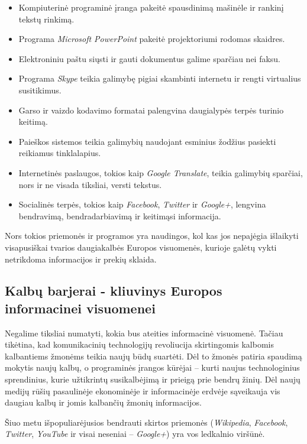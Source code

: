 \begin{multicols}{2}
\begin{itemize}
\item Kompiuterinė programinė įranga pakeitė spausdinimą mašinėle ir rankinį tekstų rinkimą.
\item Programa \textit{ Microsoft PowerPoint} pakeitė projektoriumi rodomas skaidres.
\item Elektroniniu paštu siųsti ir gauti dokumentus galime sparčiau nei faksu.
\item Programa \textit{Skype} teikia galimybę pigiai skambinti internetu ir rengti virtualius susitikimus.
\item Garso ir vaizdo kodavimo formatai palengvina daugialypės terpės turinio keitimą.
\item Paieškos sistemos teikia galimybių naudojant esminius žodžius pasiekti reikiamus tinklalapius.
\item Internetinės paslaugos, tokios kaip \textit{Google Translate}, teikia galimybių sparčiai, nors ir ne visada tiksliai, versti tekstus.
\item Socialinės terpės, tokios kaip \textit{Facebook}, \textit{Twitter} ir \textit{Google+}, lengvina bendravimą, bendradarbiavimą ir keitimąsi informacija.
\end{itemize}

Nors tokios priemonės ir programos yra naudingos, kol kas jos nepajėgia išlaikyti visapusiškai tvarios daugiakalbės Europos visuomenės, kurioje galėtų vykti netrikdoma informacijos ir prekių sklaida.

\subsection{Kalbų barjerai - kliuvinys Europos informacinei visuomenei}
  
 Negalime tiksliai numatyti, kokia bus ateities informacinė visuomenė. Tačiau tikėtina, kad komunikacinių technologijų revoliucija skirtingomis kalbomis kalbantiems žmonėms teikia naujų būdų suartėti. Dėl to žmonės patiria spaudimą mokytis naujų kalbų, o programinės įrangos kūrėjai – kurti naujus technologinius sprendinius, kurie užtikrintų susikalbėjimą ir prieigą prie bendrų žinių. Dėl naujų medijų rūšių pasaulinėje ekonominėje ir informacinėje erdvėje sąveikauja vis daugiau kalbų ir jomis kalbančių žmonių informacijos. 


Šiuo metu išpopuliarėjusios bendrauti skirtos priemonės (\textit{Wikipedia}, \textit{Facebook}, \textit{Twitter}, \textit{YouTube} ir visai neseniai – \textit{Google+}) yra vos ledkalnio viršūnė.


\end{multicols}

